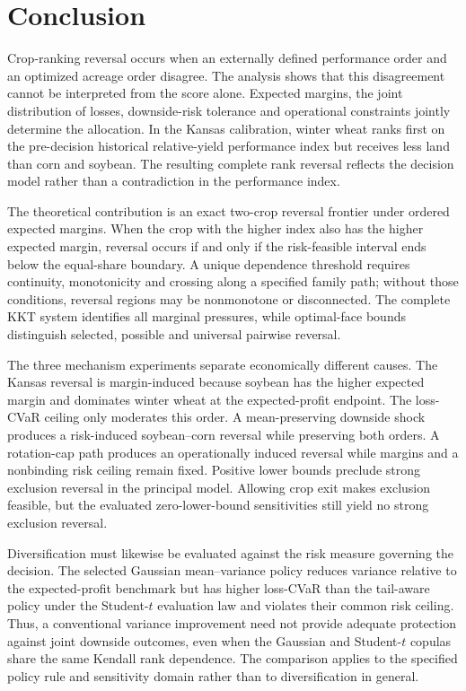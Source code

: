 \section{Conclusion}

Crop-ranking reversal occurs when an externally defined performance order and
an optimized acreage order disagree. The analysis shows that this disagreement
cannot be interpreted from the score alone. Expected margins, the joint
distribution of losses, downside-risk tolerance and operational constraints
jointly determine the allocation. In the Kansas calibration, winter wheat
ranks first on the pre-decision historical relative-yield performance index
but receives less land than corn and soybean. The resulting complete rank
reversal reflects the decision model rather than a contradiction in the
performance index.

The theoretical contribution is an exact two-crop reversal frontier under
ordered expected margins. When the crop with the higher index also has the
higher expected margin, reversal occurs if and only if the risk-feasible
interval ends below the equal-share boundary. A unique dependence threshold
requires continuity, monotonicity and crossing along a specified family path;
without those conditions, reversal regions may be nonmonotone or disconnected.
The complete KKT system identifies all marginal pressures, while optimal-face
bounds distinguish selected, possible and universal pairwise reversal.

The three mechanism experiments separate economically different causes. The
Kansas reversal is margin-induced because soybean has the higher expected
margin and dominates winter wheat at the expected-profit endpoint. The
loss-CVaR ceiling only moderates this order. A mean-preserving downside shock
produces a risk-induced soybean--corn reversal while preserving both orders. A
rotation-cap path produces an operationally induced reversal while margins and
a nonbinding risk ceiling remain fixed.
Positive lower bounds preclude strong exclusion reversal in the principal
model. Allowing crop exit makes exclusion feasible, but the evaluated
zero-lower-bound sensitivities still yield no strong exclusion reversal.

Diversification must likewise be evaluated against the risk measure governing
the decision. The selected Gaussian mean--variance policy reduces variance
relative to the expected-profit benchmark but has higher loss-CVaR than the
tail-aware policy under the Student-\(t\) evaluation law and violates their
common risk ceiling. Thus, a conventional variance improvement need not
provide adequate protection against joint downside outcomes, even when the
Gaussian and Student-\(t\) copulas share the same Kendall rank dependence. The
comparison applies to the specified policy rule and sensitivity domain rather
than to diversification in general.

